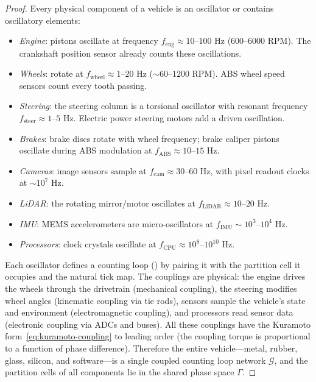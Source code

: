 \documentclass[twocolumn,10pt]{article}
\theoremstyle{definition}
\begin{document}
\begin{proof}
Every physical component of a vehicle is an oscillator or contains oscillatory elements:
\begin{itemize}[leftmargin=*]
\item \emph{Engine}: pistons oscillate at frequency $f_{\mathrm{eng}} \approx 10$--$100$ Hz (600--6000 RPM). The crankshaft position sensor already counts these oscillations.
\item \emph{Wheels}: rotate at $f_{\mathrm{wheel}} \approx 1$--$20$ Hz ($\sim 60$--$1200$ RPM). ABS wheel speed sensors count every tooth passing.
\item \emph{Steering}: the steering column is a torsional oscillator with resonant frequency $f_{\mathrm{steer}} \approx 1$--$5$ Hz. Electric power steering motors add a driven oscillation.
\item \emph{Brakes}: brake discs rotate with wheel frequency; brake caliper pistons oscillate during ABS modulation at $f_{\mathrm{ABS}} \approx 10$--$15$ Hz.
\item \emph{Cameras}: image sensors sample at $f_{\mathrm{cam}} \approx 30$--$60$ Hz, with pixel readout clocks at $\sim 10^7$ Hz.
\item \emph{LiDAR}: the rotating mirror/motor oscillates at $f_{\mathrm{LiDAR}} \approx 10$--$20$ Hz.
\item \emph{IMU}: MEMS accelerometers are micro-oscillators at $f_{\mathrm{IMU}} \sim 10^3$--$10^4$ Hz.
\item \emph{Processors}: clock crystals oscillate at $f_{\mathrm{CPU}} \approx 10^8$--$10^{10}$ Hz.
\end{itemize}
Each oscillator defines a counting loop () by pairing it with the partition cell it occupies and the natural tick map. The couplings are physical: the engine drives the wheels through the drivetrain (mechanical coupling), the steering modifies wheel angles (kinematic coupling via tie rods), sensors sample the vehicle's state and environment (electromagnetic coupling), and processors read sensor data (electronic coupling via ADCs and buses). All these couplings have the Kuramoto form~\eqref{eq:kuramoto-coupling} to leading order (the coupling torque is proportional to a function of phase difference). Therefore the entire vehicle---metal, rubber, glass, silicon, and software---is a single coupled counting loop network $\mathcal{G}$, and the partition cells of all components lie in the shared phase space $\Gamma$.
\end{proof}
\end{document}
